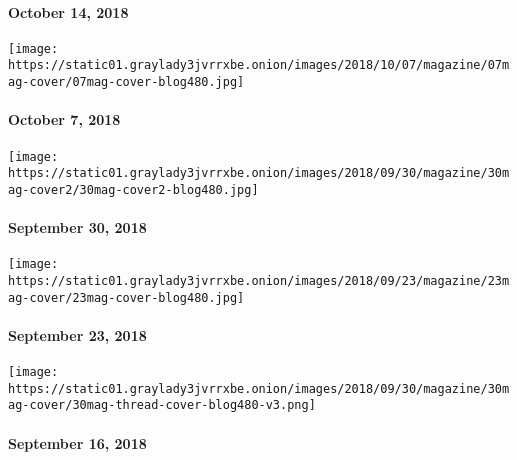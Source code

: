 \hypertarget{october-14-2018}{%
\paragraph{October 14, 2018}\label{october-14-2018}}

\href{https://www.nytimes3xbfgragh.onion/issue/magazine/2018/10/08/the-100718-issue}{}

\texttt{[image: https://static01.graylady3jvrrxbe.onion/images/2018/10/07/magazine/07mag-cover/07mag-cover-blog480.jpg]}

\hypertarget{october-7-2018}{%
\paragraph{October 7, 2018}\label{october-7-2018}}

\href{https://www.nytimes3xbfgragh.onion/issue/magazine/2018/09/28/the-93018-issue}{}

\texttt{[image: https://static01.graylady3jvrrxbe.onion/images/2018/09/30/magazine/30mag-cover2/30mag-cover2-blog480.jpg]}

\hypertarget{september-30-2018}{%
\paragraph{September 30, 2018}\label{september-30-2018}}

\href{https://www.nytimes3xbfgragh.onion/interactive/2018/09/21/magazine/voyages-travel-sounds-from-the-world.html}{}

\texttt{[image: https://static01.graylady3jvrrxbe.onion/images/2018/09/23/magazine/23mag-cover/23mag-cover-blog480.jpg]}

\hypertarget{september-23-2018}{%
\paragraph{September 23, 2018}\label{september-23-2018}}

\href{https://www.nytimes3xbfgragh.onion/issue/magazine/2018/09/24/the-91618-issue}{}

\texttt{[image: https://static01.graylady3jvrrxbe.onion/images/2018/09/30/magazine/30mag-cover/30mag-thread-cover-blog480-v3.png]}

\hypertarget{september-16-2018}{%
\paragraph{September 16, 2018}\label{september-16-2018}}

